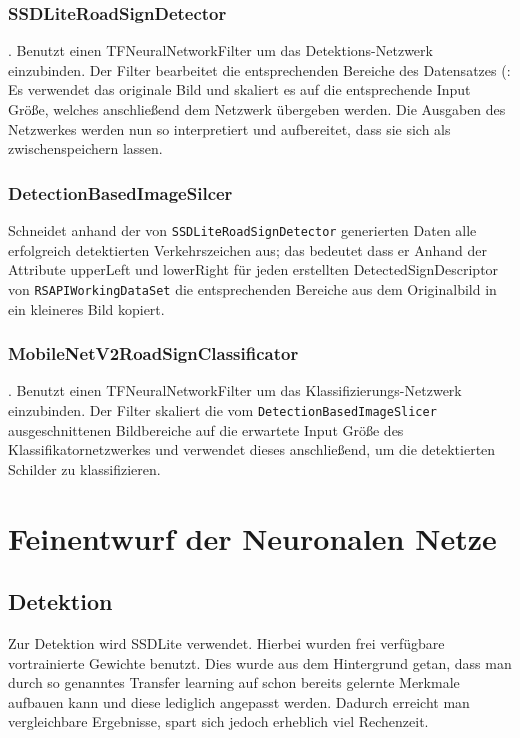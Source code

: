 \documentclass[12pt,a4paper,ngerman,enabledeprecatedfontcommands]{scrreprt}
\begin{document}
\subsubsection*{SSDLiteRoadSignDetector}
. Benutzt einen TFNeuralNetworkFilter um das Detektions-Netzwerk einzubinden. Der Filter bearbeitet die entsprechenden Bereiche des Datensatzes (: Es verwendet das originale Bild und skaliert es auf die entsprechende Input Größe, welches anschließend dem Netzwerk übergeben werden. Die Ausgaben des Netzwerkes werden nun so interpretiert und aufbereitet, dass sie sich als  zwischenspeichern lassen.\\

\subsubsection*{DetectionBasedImageSilcer}
Schneidet anhand der von \texttt{SSDLiteRoadSignDetector} generierten Daten alle erfolgreich detektierten Verkehrszeichen aus; das bedeutet dass er Anhand der Attribute upperLeft und lowerRight für jeden erstellten DetectedSignDescriptor von \texttt{RSAPIWorkingDataSet} die entsprechenden Bereiche aus dem Originalbild in ein kleineres Bild kopiert.\\

\subsubsection*{MobileNetV2RoadSignClassificator}
. Benutzt einen TFNeuralNetworkFilter um das Klassifizierungs-Netzwerk einzubinden. Der Filter skaliert die vom \texttt{DetectionBasedImageSlicer} ausgeschnittenen Bildbereiche auf die erwartete Input Größe des Klassifikatornetzwerkes und verwendet dieses anschließend, um die detektierten Schilder zu klassifizieren.\\


\section{Feinentwurf der Neuronalen Netze}
\subsection{Detektion}
Zur Detektion wird \glqq{}SSDLite\grqq{}\cite{DBLP:journals/corr/abs-1801-04381} verwendet. Hierbei wurden frei verfügbare vortrainierte Gewichte benutzt.
Dies wurde aus dem Hintergrund getan, dass man durch so genanntes \glqq{}Transfer learning\grqq{} auf schon bereits gelernte Merkmale aufbauen kann und diese lediglich angepasst werden.
Dadurch erreicht man vergleichbare Ergebnisse, spart sich jedoch erheblich viel Rechenzeit.
\end{document}

